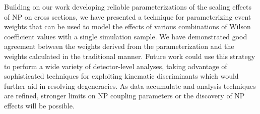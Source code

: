 Building on our work developing reliable parameterizations of the scaling
effects of NP on cross sections, we have presented a technique for
parameterizing event weights that can be used to model the effects of various
combinations of Wilson coefficient values with a single simulation sample. We
have demonstrated good agreement between the weights derived from the
parameterization and the weights calculated in the traditional manner. Future
work could use this strategy to perform a wide variety of detector-level
analyses, taking advantage of sophisticated techniques for exploiting kinematic
discriminants which would further aid in resolving degeneracies. As data
accumulate and analysis techniques are refined, stronger limits on NP coupling
parameters or the discovery of NP effects will be possible.
